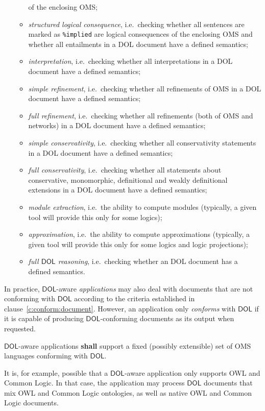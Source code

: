 \documentclass[10pt,fleqn,final]{scrreprt}
\newcommand*{\syntax}[1]{\texttt{#1}}
\newcommand*{\shall}{\textbf{shall}\xspace}
\newcommand*{\DOL}{\ensuremath{\mathsf{DOL}}\xspace}
\newcommand{\clauserefname}{clause}
\newcommand{\cref}[1]{\clauserefname~\ref{#1}}
\begin{document}
\begin{itemize}
\begin{itemize}
of the enclosing OMS;
\item \emph{structured logical consequence}, i.e.\ checking whether all sentences are marked as \syntax{\%implied} are logical consequences
  of the enclosing OMS and whether all entailments in a DOL document
  have a defined semantics;
\item \emph{interpretation}, i.e.\ checking whether all interpretations in a DOL document have a defined semantics;
\item \emph{simple refinement}, i.e.\ checking whether all
  refinements of OMS in a DOL document have a defined semantics;
\item \emph{full refinement}, i.e.\ checking whether all refinements
  (both of OMS and networks) in a DOL document have a defined
  semantics;
\item \emph{simple conservativity}, i.e.\ checking whether all conservativity
  statements in a DOL document have a defined semantics;
\item \emph{full conservativity}, i.e.\ checking whether all
  statements about conservative, monomorphic, definitional and weakly
  definitional extensions in a DOL document have a defined semantics;
\item \emph{module extraction}, i.e.\ the ability to compute modules
(typically, a given tool will provide this only for some logics);
\item \emph{approximation}, i.e.\ the ability to compute approximations
(typically, a given tool will provide this only for some logics
and logic projections);
\item \emph{full \DOL reasoning}, i.e.\ checking whether an DOL
  document has a defined semantics.
\end{itemize}
\end{itemize}


In practice, \DOL-aware \emph{applications} may also deal with documents that are not conforming 
with \DOL according to the criteria established in \cref{c:conform:document}.  However, an 
application only \emph{conforms} with \DOL if it is capable of producing \DOL-conforming documents as 
its output when requested.


\DOL-aware applications \shall support a fixed (possibly extensible) set of OMS languages
conforming with \DOL.

  It is, for example, possible that a \DOL-aware application only supports OWL
and Common Logic.  In that case, the application may process \DOL documents that mix OWL and Common 
Logic ontologies, as well as native OWL and Common Logic documents.
\end{document}
